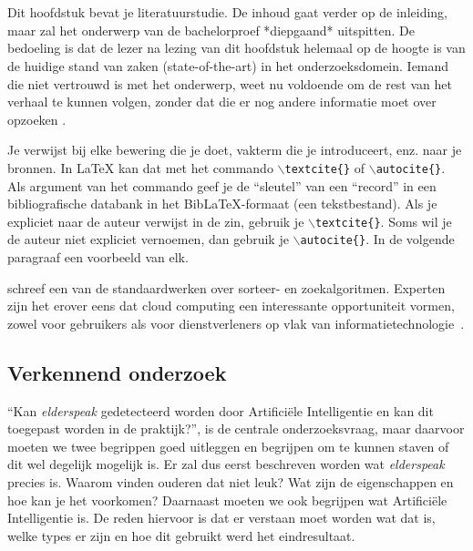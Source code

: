 \chapter{}
\label{ch:stand-van-zaken}




\color{blue}
Dit hoofdstuk bevat je literatuurstudie. De inhoud gaat verder op de inleiding, maar zal het onderwerp van de bachelorproef *diepgaand* uitspitten. De bedoeling is dat de lezer na lezing van dit hoofdstuk helemaal op de hoogte is van de huidige stand van zaken (state-of-the-art) in het onderzoeksdomein. Iemand die niet vertrouwd is met het onderwerp, weet nu voldoende om de rest van het verhaal te kunnen volgen, zonder dat die er nog andere informatie moet over opzoeken \autocite{Pollefliet2011}.

Je verwijst bij elke bewering die je doet, vakterm die je introduceert, enz. naar je bronnen. In \LaTeX{} kan dat met het commando \texttt{$\backslash${textcite\{\}}} of \texttt{$\backslash${autocite\{\}}}. Als argument van het commando geef je de ``sleutel'' van een ``record'' in een bibliografische databank in het Bib\LaTeX{}-formaat (een tekstbestand). Als je expliciet naar de auteur verwijst in de zin, gebruik je \texttt{$\backslash${}textcite\{\}}.
Soms wil je de auteur niet expliciet vernoemen, dan gebruik je \texttt{$\backslash${}autocite\{\}}. In de volgende paragraaf een voorbeeld van elk.

\textcite{Knuth1998} schreef een van de standaardwerken over sorteer- en zoekalgoritmen. Experten zijn het erover eens dat cloud computing een interessante opportuniteit vormen, zowel voor gebruikers als voor dienstverleners op vlak van informatietechnologie~\autocite{Creeger2009}.

\color{black}

\section{Verkennend onderzoek}
\label{sec:verkennend-onderzoek}
``Kan \textit{elderspeak} gedetecteerd worden door Artificiële Intelligentie en kan dit toegepast worden in de praktijk?'', is de centrale onderzoeksvraag, maar daarvoor moeten we twee begrippen goed uitleggen en begrijpen om te kunnen staven of dit wel degelijk mogelijk is.
Er zal dus eerst beschreven worden wat \textit{elderspeak} precies is. Waarom vinden ouderen dat niet leuk? Wat zijn de eigenschappen en hoe kan je het voorkomen?
Daarnaast moeten we ook begrijpen wat Artificiële Intelligentie is. De reden hiervoor is dat er verstaan moet worden wat dat is, welke types er zijn en hoe dit gebruikt werd het eindresultaat.

